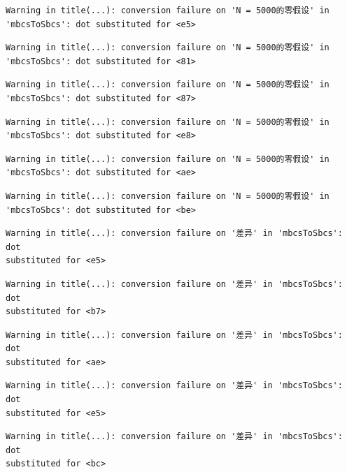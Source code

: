 \documentclass[
  letterpaper,
  DIV=11,
  numbers=noendperiod]{scrreprt}
\begin{document}
\begin{verbatim}
Warning in title(...): conversion failure on 'N = 5000的零假设' in
'mbcsToSbcs': dot substituted for <e5>
\end{verbatim}

\begin{verbatim}
Warning in title(...): conversion failure on 'N = 5000的零假设' in
'mbcsToSbcs': dot substituted for <81>
\end{verbatim}

\begin{verbatim}
Warning in title(...): conversion failure on 'N = 5000的零假设' in
'mbcsToSbcs': dot substituted for <87>
\end{verbatim}

\begin{verbatim}
Warning in title(...): conversion failure on 'N = 5000的零假设' in
'mbcsToSbcs': dot substituted for <e8>
\end{verbatim}

\begin{verbatim}
Warning in title(...): conversion failure on 'N = 5000的零假设' in
'mbcsToSbcs': dot substituted for <ae>
\end{verbatim}

\begin{verbatim}
Warning in title(...): conversion failure on 'N = 5000的零假设' in
'mbcsToSbcs': dot substituted for <be>
\end{verbatim}

\begin{verbatim}
Warning in title(...): conversion failure on '差异' in 'mbcsToSbcs': dot
substituted for <e5>
\end{verbatim}

\begin{verbatim}
Warning in title(...): conversion failure on '差异' in 'mbcsToSbcs': dot
substituted for <b7>
\end{verbatim}

\begin{verbatim}
Warning in title(...): conversion failure on '差异' in 'mbcsToSbcs': dot
substituted for <ae>
\end{verbatim}

\begin{verbatim}
Warning in title(...): conversion failure on '差异' in 'mbcsToSbcs': dot
substituted for <e5>
\end{verbatim}

\begin{verbatim}
Warning in title(...): conversion failure on '差异' in 'mbcsToSbcs': dot
substituted for <bc>
\end{verbatim}
\end{document}
